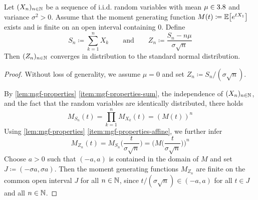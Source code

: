 \begin{theorem}\label{thm:central-limit-theorem}
Let $(X_n)_{n\in\mathbb{N}}$ be a sequence of i.i.d. random variables with mean $\mu \in 3.8$ and variance $\sigma^2>0$.
Assume that the moment generating function
\(
M(t)
\coloneq
\operatorname{\mathbb{E}}\bigl[e^{tX_1}\bigr]
\)
exists and is finite on an open interval containing $0$.
Define
\[
S_n
\coloneq
\sum_{k=1}^n X_k
\qquad\text{and}\qquad
Z_n
\coloneq
\frac{S_n-n\mu}{\sigma\sqrt{n}}
\]
Then $(Z_n)_{n\in\mathbb{N}}$ converges in distribution to the standard normal distribution.
\end{theorem}
\begin{proof}
Without loss of generality, we assume $\mu=0$ and set $Z_n\coloneq S_n/(\sigma\sqrt{n})$.

By \autoref{lem:mgf-properties} \ref{item:mgf-properties-sum}, the independence of $(X_n)_{n\in\mathbb{N}}$, and the fact that the random variables are identically distributed, there holds
\[
M_{S_n}(t)
=
\prod_{k=1}^n M_{X_k}(t)
=
(M(t))^n
\]
Using \autoref{lem:mgf-properties} \ref{item:mgf-properties-affine}, we further infer
\begin{equation}\label{eq:clt-mgf-standardized-sum}
M_{Z_n}(t)
=
M_{S_n}\biggl(\frac{t}{\sigma\sqrt{n}}\biggr)
=
\biggl(M\biggl(\frac{t}{\sigma\sqrt{n}}\biggr)\biggr)^n
\end{equation}
Choose $a>0$ such that $(-a,a)$ is contained in the domain of $M$ and set $J\coloneq(-\sigma a,\sigma a)$.
Then the moment generating functions $M_{Z_n}$ are finite on the common open interval $J$ for all $n\in\mathbb{N}$,
since $t/(\sigma\sqrt{n}) \in (-a,a)$ for all $t \in J$ and all $n\in\mathbb{N}$.


\end{proof}
